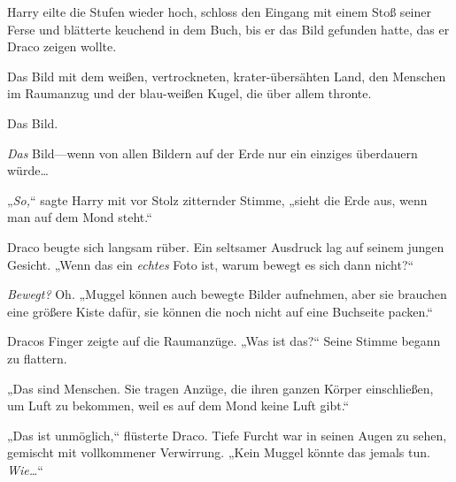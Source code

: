 Harry eilte die Stufen wieder hoch, schloss den Eingang mit einem Stoß seiner Ferse und blätterte keuchend in dem Buch, bis er das Bild gefunden hatte, das er Draco zeigen wollte.

Das Bild mit dem weißen, vertrockneten, krater-übersähten Land, den Menschen im Raumanzug und der blau-weißen Kugel, die über allem thronte.

Das Bild.

\emph{Das} Bild—wenn von allen Bildern auf der Erde nur ein einziges überdauern würde…

„\emph{So,}“ sagte Harry mit vor Stolz zitternder Stimme, „sieht die Erde aus, wenn man auf dem Mond steht.“

Draco beugte sich langsam rüber. Ein seltsamer Ausdruck lag auf seinem jungen Gesicht. „Wenn das ein \emph{echtes} Foto ist, warum bewegt es sich dann nicht?“

\emph{Bewegt?} Oh. „Muggel können auch bewegte Bilder aufnehmen, aber sie brauchen eine größere Kiste dafür, sie können die noch nicht auf eine Buchseite packen.“

Dracos Finger zeigte auf die Raumanzüge. „Was ist das?“ Seine Stimme begann zu flattern.

„Das sind Menschen. Sie tragen Anzüge, die ihren ganzen Körper einschließen, um Luft zu bekommen, weil es auf dem Mond keine Luft gibt.“

„Das ist unmöglich,“ flüsterte Draco. Tiefe Furcht war in seinen Augen zu sehen, gemischt mit vollkommener Verwirrung. „Kein Muggel könnte das jemals tun. \emph{Wie…}“

